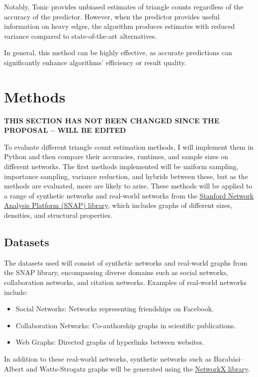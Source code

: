 \documentclass[11pt]{article}
\begin{document}
Notably, Tonic provides unbiased estimates of triangle counts regardless of the accuracy of the predictor.
However, when the predictor provides useful information on heavy edges, the algorithm produces estimates with reduced variance compared to state-of-the-art alternatives.

In general, this method can be highly effective, as accurate predictions can significantly enhance algorithms' efficiency or result quality.

\newpage

\section{Methods}

\textbf{THIS SECTION HAS NOT BEEN CHANGED SINCE THE PROPOSAL -- WILL BE EDITED}

To evaluate different triangle count estimation methods, I will implement them in Python and then compare their accuracies, runtimes, and sample sizes on different networks.
The first methods implemented will be uniform sampling, importance sampling, variance reduction, and hybrids between these, but as the methods are evaluated, more are likely to arise.
These methods will be applied to a range of synthetic networks and real-world networks from the \href{https://snap.stanford.edu/index.html}{Stanford Network Analysis Platform (SNAP) library}, which includes graphs of different sizes, densities, and structural properties.

\subsection{Datasets}

The datasets used will consist of synthetic networks and real-world graphs from the SNAP library, encompassing diverse domains such as social networks, collaboration networks, and citation networks.
Examples of real-world networks include:

\begin{itemize}
    \item Social Networks: Networks representing friendships on Facebook.
    \item Collaboration Networks: Co-authorship graphs in scientific publications.
    \item Web Graphs: Directed graphs of hyperlinks between websites.
\end{itemize}

In addition to these real-world networks, synthetic networks such as Barabási–Albert \cite{albert_statistical_2002} and Watts-Strogatz \cite{watts_collective_1998} graphs will be generated using the \href{https://networkx.org/}{NetworkX library}.
\end{document}
